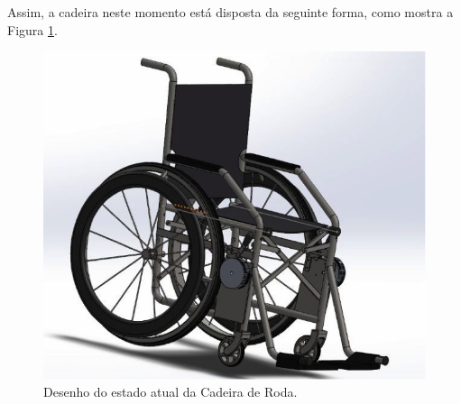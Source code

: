 Assim, a cadeira neste momento está disposta da seguinte forma, como mostra a
Figura \ref{fig:actual_state}.

\begin{figure}
    \begin{center}
        \includegraphics{figuras/actual_state.png}
    \end{center}
    \caption{Desenho do estado atual da Cadeira de Roda.}
    \label{fig:actual_state}
\end{figure}

